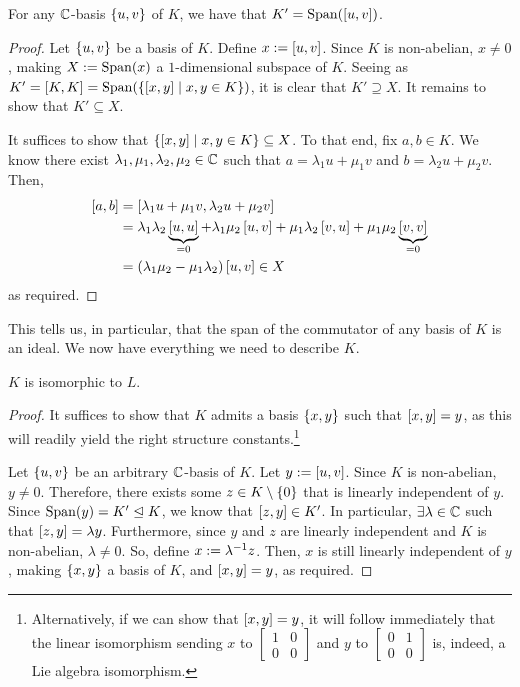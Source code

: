 \begin{lemma}
    For any $\mathbb{C}$-basis $\left\{ u, v \right\}$ of $K$, we have that $K' = \operatorname{Span}\!\left( \left[ u, v \right] \right)$.
\end{lemma}
\begin{proof}
    Let $\left\{ u, v \right\}$ be a basis of $K$. Define $x := \left[ u, v \right]$. Since $K$ is non-abelian, $x \neq 0$, making $X := \operatorname{Span}\!\left( x \right)$ a $1$-dimensional subspace of $K$. Seeing as $K' = \left[ K, K \right] = \operatorname{Span}\!\left( \left\{ \left[ x, y \right] \; \middle\vert \; x, y \in K \right\} \right)$, it is clear that $K' \supseteq X$. It remains to show that $K' \subseteq X$.

    It suffices to show that $\left\{ \left[ x, y \right] \; \middle\vert \; x, y \in K \right\} \subseteq X$. To that end, fix $a, b \in K$. We know there exist $\lambda_1, \mu_1, \lambda_2, \mu_2 \in \mathbb{C}$ such that $a = \lambda_1 u + \mu_1 v$ and $b = \lambda_2 u + \mu_2 v$. Then,
    \begin{align*}
        \left[ a, b \right]
        &= \left[ \lambda_1 u + \mu_1 v, \lambda_2 u + \mu_2 v \right] \\
        &= \lambda_1 \lambda_2 \underbrace{\left[ u, u \right]}_{= 0} + \lambda_1 \mu_2 \left[ u, v \right] + \mu_1 \lambda_2 \left[ v, u \right] + \mu_1 \mu_2 \underbrace{\left[ v, v \right]}_{= 0} \\
        &= \left( \lambda_1 \mu_2 - \mu_1 \lambda_2 \right) \left[ u, v \right] \in X
    \end{align*}
    as required.
\end{proof}

This tells us, in particular, that the span of the commutator of any basis of $K$ is an ideal. We now have everything we need to describe $K$.

\begin{boxproposition}
    $K$ is isomorphic to $L$.
\end{boxproposition}
\begin{proof}
    It suffices to show that $K$ admits a basis $\left\{ x, y \right\}$ such that $\left[ x, y \right] = y$, as this will readily yield the right structure constants.\footnote{Alternatively, if we can show that $\left[ x, y \right] = y$, it will follow immediately that the linear isomorphism sending $x$ to $\begin{bmatrix} 1 & 0 \\ 0 & 0 \end{bmatrix}$ and $y$ to $\begin{bmatrix} 0 & 1 \\ 0 & 0 \end{bmatrix}$ is, indeed, a Lie algebra isomorphism.}
    
    Let $\left\{ u, v \right\}$ be an arbitrary $\mathbb{C}$-basis of $K$. Let $y := \left[ u, v \right]$. Since $K$ is non-abelian, $y \neq 0$. Therefore, there exists some $z \in K \setminus \left\{ 0 \right\}$ that is linearly independent of $y$. Since $\operatorname{Span}\!\left( y \right) = K' \trianglelefteq K$, we know that $\left[ z, y \right] \in K'$. In particular, $\exists \lambda \in \mathbb{C}$ such that $\left[ z, y \right] = \lambda y$. Furthermore, since $y$ and $z$ are linearly independent and $K$ is non-abelian, $\lambda \neq 0$. So, define $x := \lambda^{-1} z$. Then, $x$ is still linearly independent of $y$, making $\left\{ x, y \right\}$ a basis of $K$, and $\left[ x, y \right] = y$, as required.
\end{proof}

